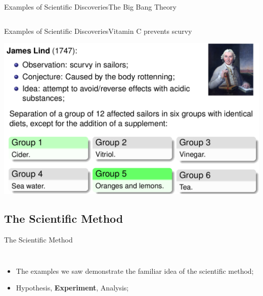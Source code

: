 \documentclass{beamer}
\begin{document}
\begin{CJK}{UTF8}{ipxm}
\begin{frame}{Examples of Scientific Discoveries}{The Big Bang Theory}
\begin{columns}
  \end{columns}
\end{frame}

\begin{frame}{Examples of Scientific Discoveries}{Vitamin C prevents scurvy}
  \begin{center}
    \includegraphics[width=1\textwidth]{../img/wikipedia_scurvy}
  \end{center}

\end{frame}


\subsection{The Scientific Method}
\begin{frame}{The Scientific Method}{}
  \begin{columns}
    \begin{itemize}
      \item The examples we saw demonstrate the familiar idea of the scientific method;
      \bigskip

      \item Hypothesis, {\bf Experiment}, Analysis;
      \bigskip


\end{itemize}
\end{columns}
\end{frame}
\end{CJK}
\end{document}
